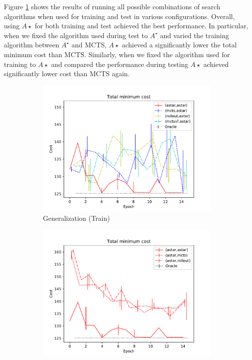 \documentclass[fullpage,twocolumn]{article} %
\begin{document}
Figure \ref{fig:train-comparison} shows the results of running all possible combinations of search algorithms when used for training and test in various configurations. Overall, using $A\star$ for both training and test achieved the best performance. In particular, when we fixed the algorithm used during test to $A^\star$ and varied the training algorithm between $A^\star$ and MCTS, $A\star$ achieved a significantly lower the total minimum cost than MCTS. Similarly, when we fixed the algorithm used for training to $A\star$ and compared the performance during testing $A\star$ achieved significantly lower cost than MCTS again.

\begin{figure}[t!]
	\centering
  	\begin{subfigure}[t]{0.33\textwidth}
  		\centering
	    \includegraphics[width=\textwidth]{generalization-train-compare.pdf}
	    \caption{Generalization (Train)}
	    \label{fig:train-comparison}
	\end{subfigure}%
  	\begin{subfigure}[t]{0.33\textwidth}
  		\centering
	    \includegraphics[width=\textwidth]{generalization-test-compare.pdf}

\end{subfigure}
\end{figure}
\end{document}
